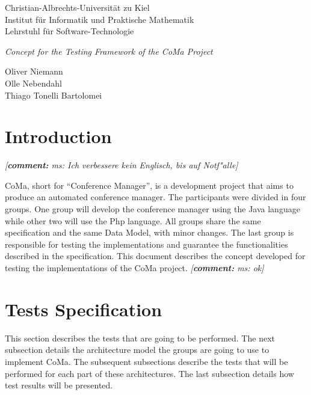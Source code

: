 \documentclass[11pt]{article}
\newcommand{\commentary}[1]{\textsl{\small[\textbf{comment:} #1]}}
\begin{document}
\begin{center}

{\large
{\sc Christian-Albrechts-Universit\"{a}t zu Kiel} \\
Institut f\"{u}r Informatik und Praktische Mathematik \\
Lehrstuhl f\"{u}r Software-Technologie }

\bigskip

{\Large\it Concept for the Testing Framework of the CoMa Project}

\bigskip

{\small Oliver Niemann} \\
{\small Olle Nebendahl} \\
{\small Thiago Tonelli Bartolomei}

\end{center}

\section{Introduction}

\indent

\commentary{ms: Ich verbessere kein Englisch, bis auf Notf"alle}

CoMa, short for ``Conference Manager'', is a development project that aims
to produce an automated conference manager. The participants were divided
in four groups. One group will develop the conference manager using the
Java language while other two will use the Php language. All groups share
the same specification and the same Data Model, with minor changes. The
last group is responsible for testing the implementations and guarantee the
functionalities described in the specification. This document describes the
concept developed for testing the implementations of the CoMa project.
\commentary{ms: ok}

\section{Tests Specification}

\indent

This section describes the tests that are going to be performed. The next subsection details the architecture model the groups are going to use to implement CoMa. The subsequent subsections describe the tests that will be performed for each part of these architectures. The last subsection details how test results will be presented.
\end{document}
